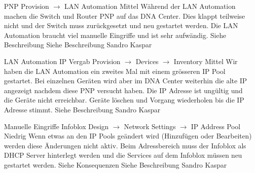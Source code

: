 \bugreport
{PNP}
{Provision $\rightarrow$ LAN Automation}
{Mittel}
{Während der LAN Automation machen die Switch und Router PNP auf das DNA Center. Dies klappt teilweise nicht und der Switch muss zurückgesetzt und neu gestartet werden.}
{Die LAN Automation braucht viel manuelle Eingriffe und ist sehr aufwändig.}
{Siehe Beschreibung}
{
	Siehe Beschreibung
}
{Sandro Kaspar}
{}


\bugreport
{LAN Automation IP Vergab}
{Provision $\rightarrow$ Devices $\rightarrow$ Inventory}
{Mittel}
{Wir haben die LAN Automation ein zweites Mal mit einem grösseren IP Pool gestartet. Bei einzelnen Geräten wird aber im DNA Center weiterhin die alte IP angezeigt nachdem diese PNP versucht haben.}
{Die IP Adresse ist ungültig und die Geräte nicht erreichbar.}
{Geräte löschen und Vorgang wiederholen bis die IP Adresse stimmt.}
{
	Siehe Beschreibung
}
{Sandro Kaspar}
{}

\bugreport
{Manuelle Eingriffe Infoblox}
{Design $\rightarrow$ Network Settings $\rightarrow$ IP Address Pool}
{Niedrig}
{Wenn etwas an den IP Pools geändert wird (Hinzufügen oder Bearbeiten) werden diese Änderungen nicht aktiv.}
{Beim Adressbereich muss der Infoblox als DHCP Server hinterlegt werden und die Services auf dem Infoblox müssen neu gestartet werden.}
{Siehe Konsequenzen}
{
	Siehe Beschreibung
}
{Sandro Kaspar}
{}





